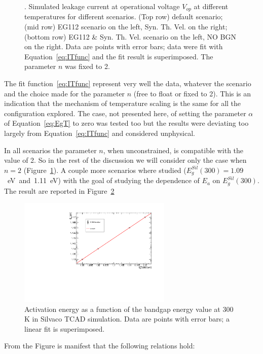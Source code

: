 \begin{figure}[!htbp]
\caption{\label{fig:Ea_Fit_fixn}. Simulated leakage current at operational voltage $V_{op}$ at different 
temperatures for different scenarios. (Top row) default scenario; (mid row) EG112 scenario on the left,  Syn. Th. Vel. on the right;  (bottom row)  EG112 \&  Syn. Th. Vel. scenario on the left, NO BGN 
on the right. Data are points with error bars; data were fit with Equation~\ref{eq:ITfunc}  and the fit result is superimposed. The parameter $n$  was fixed to 2.}
\end{figure}

The fit function~\ref{eq:ITfunc} represent very well the data, whatever the scenario and the choice 
made for the parameter $n$ (free to float or fixed to 2). This is an indication that the  
mechanism of temperature scaling is the same for all the configuration explored. The case, 
not presented here, of setting the parameter $\alpha$ of Equation~\ref{eq:EgT} to zero was tested too 
but the results were deviating too largely from Equation~\ref{eq:ITfunc} and considered 
unphysical. 

In all scenarios the parameter $n$, when unconstrained, is compatible with the value of 2. So 
in the rest of the discussion we will consider only the case when $n=2$ (Figure~\ref{fig:Ea_Fit_fixn}).
A couple more scenarios where studied ($E^{Sil}_g(300)=1.09$~eV~and~1.11~eV) with the 
goal of studying the dependence of $E_a$ on $E^{Sil}_g(300)$. The result are reported in 
Figure~\ref{fig:Ea_vs_Eg}

\begin{figure}[!htbp]
\centering
\includegraphics[width=0.65\textwidth]{Ea_vs_Eg.pdf}
\caption{\label{fig:Ea_vs_Eg}Activation energy as a function of the bandgap energy value at 300 K 
in Silvaco TCAD simulation. Data are points with error bars; a linear fit is superimposed.}
\end{figure}
From the Figure is manifest that the following relations hold:


